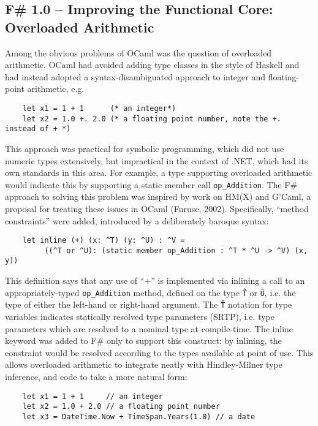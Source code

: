 \documentclass[acmsmall,review]{acmart}\settopmatter{printfolios=true,printccs=false,printacmref=false}
\begin{document}
\subsection*{F\# 1.0 – Improving the Functional Core: Overloaded Arithmetic }

Among the obvious problems of OCaml was the question of overloaded arithmetic.  OCaml had avoided adding type classes in the style of Haskell and had instead adopted a syntax-disambiguated approach to integer and floating-point arithmetic, e.g.

\begin{verbatim}
    let x1 = 1 + 1      (* an integer*)
    let x2 = 1.0 +. 2.0 (* a floating point number, note the +. instead of + *)
\end{verbatim}

This approach was practical for symbolic programming, which did not use numeric types extensively, but impractical in the context of .NET, which had its own standards in this area. For example, a type supporting overloaded arithmetic would indicate this by supporting a static member call \texttt{op\_Addition}. The F\# approach to solving this problem was inspired by work on HM(X) and G'Caml, a proposal for treating these issues in OCaml (Furuse, 2002).  Specifically, “method constraints” were added, introduced by a deliberately baroque syntax:

\begin{verbatim}
    let inline (+) (x: ^T) (y: ^U) : ^V = 
         ((^T or ^U): (static member op_Addition : ^T * ^U -> ^V) (x, y))
\end{verbatim}

This definition says that any use of “+” is implemented via inlining a call to an appropriately-typed \texttt{op\_Addition} method, defined on the type \texttt{\^T} or \texttt{\^U}, i.e. the type of either the left-hand or right-hand argument.  The \texttt{\^T} notation for type variables indicates statically resolved type parameters (SRTP), i.e. type parameters which are resolved to a nominal type at compile-time.  The inline keyword was added to F\# only to support this construct: by inlining, the constraint would be resolved according to the types available at point of use. This allows overloaded arithmetic to integrate neatly with Hindley-Milner type inference, and code to take a more natural form:

\begin{verbatim}
    let x1 = 1 + 1     // an integer
    let x2 = 1.0 + 2.0 // a floating point number
    let x3 = DateTime.Now + TimeSpan.Years(1.0) // a date
\end{verbatim}
\end{document}
